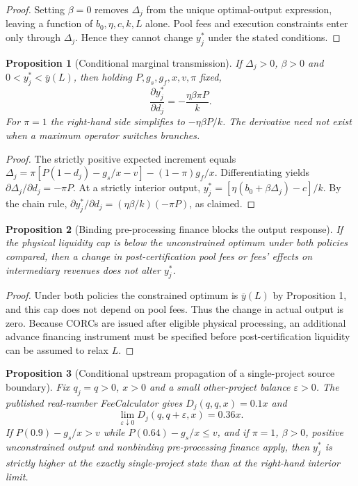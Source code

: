 \documentclass[11pt]{article}
\newtheorem{proposition}{Proposition}
\begin{document}
\begin{proof}
Setting $\beta=0$ removes $\Delta_j$ from the unique optimal-output expression, leaving a function of $b_0,\eta,c,k,L$ alone. Pool fees and execution constraints enter only through $\Delta_j$. Hence they cannot change $y_j^*$ under the stated conditions.
\end{proof}
\begin{proposition}[Conditional marginal transmission]
If $\Delta_j>0$, $\beta>0$ and $0<y_j^*<\overline y(L)$, then holding $P,g_s,g_f,x,v,\pi$ fixed,
\begin{equation}
 \boxed{\frac{\partial y_j^*}{\partial d_j}=-\frac{\eta\beta\pi P}{k}.}
\end{equation}
For $\pi=1$ the right-hand side simplifies to $-\eta\beta P/k$. The derivative need not exist when a maximum operator switches branches.
\end{proposition}
\begin{proof}
The strictly positive expected increment equals $\Delta_j=\pi[P(1-d_j)-g_s/x-v]-(1-\pi)g_f/x$. Differentiating yields $\partial\Delta_j/\partial d_j=-\pi P$. At a strictly interior output, $y_j^*=[\eta(b_0+\beta\Delta_j)-c]/k$. By the chain rule, $\partial y_j^*/\partial d_j=(\eta\beta/k)(-\pi P)$, as claimed.
\end{proof}
\begin{proposition}[Binding pre-processing finance blocks the output response]
If the physical liquidity cap is below the unconstrained optimum under both policies compared, then a change in post-certification pool fees or fees' effects on intermediary revenues does not alter $y_j^*$.
\end{proposition}
\begin{proof}
Under both policies the constrained optimum is $\overline y(L)$ by Proposition 1, and this cap does not depend on pool fees. Thus the change in actual output is zero. Because CORCs are issued after eligible physical processing, an additional advance financing instrument must be specified before post-certification liquidity can be assumed to relax $L$.
\end{proof}
\begin{proposition}[Conditional upstream propagation of a single-project source boundary]
Fix $q_j=q>0$, $x>0$ and a small other-project balance $\varepsilon>0$. The published real-number FeeCalculator gives $D_j(q,q,x)=0.1x$ and
\begin{equation}
 \lim_{\varepsilon\downarrow0}D_j(q,q+\varepsilon,x)=0.36x.
\end{equation}
If $P(0.9)-g_s/x>v$ while $P(0.64)-g_s/x\leq v$, and if $\pi=1$, $\beta>0$, positive unconstrained output and nonbinding pre-processing finance apply, then $y_j^*$ is strictly higher at the exactly single-project state than at the right-hand interior limit.
\end{proposition}
\end{document}
